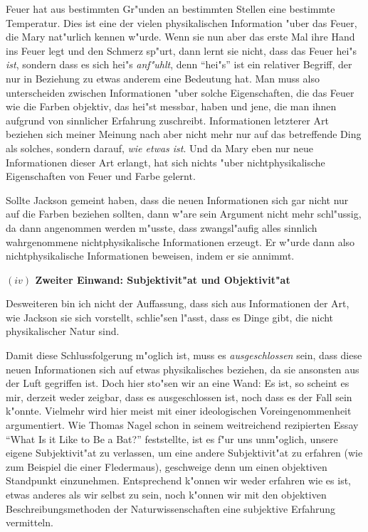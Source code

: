 \documentclass[a4paper, emulatestandardclasses, 12pt]{scrartcl}
\begin{document}
\begin{onehalfspace}
Feuer hat aus bestimmten Gr"unden an bestimmten Stellen eine bestimmte Temperatur. Dies ist eine der vielen physikalischen Information "uber das Feuer, die Mary nat"urlich kennen w"urde. Wenn sie nun aber das erste Mal ihre Hand ins Feuer legt und den Schmerz sp"urt, dann lernt sie nicht, dass das Feuer hei"s \emph{ist}, sondern dass es sich hei"s \emph{anf"uhlt}, denn "`hei"s"' ist ein relativer Begriff, der nur in Beziehung zu etwas anderem eine Bedeutung hat. Man muss also unterscheiden zwischen Informationen "uber solche Eigenschaften, die das Feuer wie die Farben objektiv, das hei"st messbar, haben und jene, die man ihnen aufgrund von sinnlicher Erfahrung zuschreibt. Informationen letzterer Art beziehen sich meiner Meinung nach aber nicht mehr nur auf das betreffende Ding als solches, sondern darauf, \emph{wie etwas ist}. Und da Mary eben nur neue Informationen dieser Art erlangt, hat sich nichts "uber nichtphysikalische Eigenschaften von Feuer und Farbe gelernt. 

Sollte Jackson gemeint haben, dass die neuen Informationen sich gar nicht nur auf die Farben beziehen sollten, dann w"are sein Argument nicht mehr schl"ussig, da dann angenommen werden m"usste, dass zwangsl"aufig alles sinnlich wahrgenommene nichtphysikalische Informationen erzeugt. Er w"urde dann also nichtphysikalische Informationen beweisen, indem er sie annimmt.

\vspace{5mm}
\noindent\textbf{$(iv)$ Zweiter Einwand: Subjektivit"at und Objektivit"at}

\noindent Desweiteren bin ich nicht der Auffassung, dass sich aus Informationen der Art, wie Jackson sie sich vorstellt, schlie"sen l"asst, dass es Dinge gibt, die nicht physikalischer Natur sind. %

Damit diese Schlussfolgerung m"oglich ist, muss es \emph{ausgeschlossen} sein, dass diese neuen Informationen sich auf etwas physikalisches beziehen, da sie ansonsten aus der Luft gegriffen ist. Doch hier sto"sen wir an eine Wand: Es ist, so scheint es mir, derzeit weder zeigbar, dass es ausgeschlossen ist, noch dass es der Fall sein k"onnte. Vielmehr wird hier meist mit einer ideologischen Voreingenommenheit argumentiert. Wie Thomas Nagel schon in seinem weitreichend rezipierten Essay "`What Is it Like to Be a Bat?"' \citep{nagel1974like} feststellte, ist es f"ur uns unm"oglich, unsere eigene Subjektivit"at zu verlassen, um eine andere Subjektivit"at zu erfahren (wie zum Beispiel die einer Fledermaus), geschweige denn um einen objektiven Standpunkt einzunehmen. Entsprechend k"onnen wir weder erfahren wie es ist, etwas anderes als wir selbst zu sein, noch k"onnen wir mit den objektiven Beschreibungsmethoden der Naturwissenschaften eine subjektive Erfahrung vermitteln. 


\end{onehalfspace}
\end{document}
